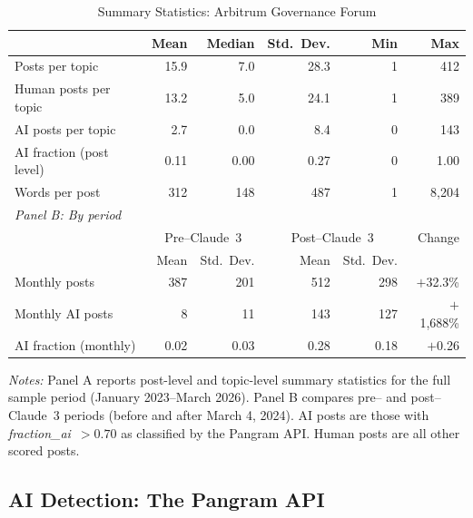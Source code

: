\documentclass[12pt]{article}
\begin{document}
\begin{table}[H]
\centering
\caption{Summary Statistics: Arbitrum Governance Forum}
\label{tab:summary_forum}
\begin{singlespace}
\begin{tabular}{lrrrrr}
\toprule
 & Mean & Median & Std.\ Dev. & Min & Max \\
\midrule
Posts per topic         & 15.9 & 7.0  & 28.3 & 1   & 412 \\
Human posts per topic   & 13.2 & 5.0  & 24.1 & 1   & 389 \\
AI posts per topic      &  2.7 & 0.0  &  8.4 & 0   & 143 \\
AI fraction (post level)& 0.11 & 0.00 &  0.27 & 0  & 1.00 \\
Words per post          & 312  & 148  & 487  & 1   & 8,204 \\
\midrule
\multicolumn{6}{l}{\textit{Panel B: By period}} \\
\midrule
 & \multicolumn{2}{c}{Pre--Claude~3} & \multicolumn{2}{c}{Post--Claude~3} & Change \\
 & Mean & Std.\ Dev. & Mean & Std.\ Dev. & \\
\midrule
Monthly posts       & 387 & 201  & 512 & 298  & $+$32.3\% \\
Monthly AI posts    &   8 &  11  & 143 & 127  & $+$1,688\% \\
AI fraction (monthly)& 0.02 & 0.03 & 0.28 & 0.18 & $+$0.26 \\
\bottomrule
\end{tabular}
\begin{flushleft}
\small\textit{Notes:} Panel A reports post-level and topic-level summary statistics
for the full sample period (January 2023--March 2026). Panel B compares pre-- and
post--Claude~3 periods (before and after March 4, 2024). AI posts are those with
\textit{fraction\_ai}~$> 0.70$ as classified by the Pangram API. Human posts are
all other scored posts.
\end{flushleft}
\end{singlespace}
\end{table}

\subsection{AI Detection: The Pangram API}
\end{document}
